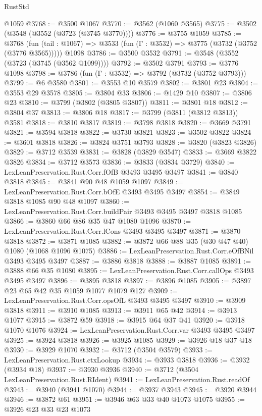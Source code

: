 \begin{lexlean}{RustStd}
\begin{coremodule}
    @1059
@3768 := @3500 @1067
@3770 := @3562 (@1060 @3565)
@3775 := @3502 (@3548 (@3552 (@3723 (@3745 @3770))))
@3776 := @3755 @1059
@3785 := @3768
    (fun (tail : @1067) => @3533 (fun (Γ : @3532) => @3775 (@3732 (@3752 (@3776 @3565)))))
    @1098
@3786 := @3500 @3532
@3791 := @3548 (@3552 (@3723 (@3745 (@3562 @1099))))
@3792 := @3502 @3791
@3793 := @3776 @1098
@3798 := @3786 (fun (Γ : @3532) => @3792 (@3732 (@3752 @3793)))
@3799 := @6 @3580
@3801 := @3553 @10 @3579
@3802 := @3801 @23
@3804 := @3553 @29 @3578
@3805 := @3804 @33
@3806 := @1429 @10
@3807 := @3806 @23
@3810 := @3799 (@3802 (@3805 @3807))
@3811 := @3801 @18
@3812 := @3804 @37
@3813 := @3806 @18
@3817 := @3799 (@3811 (@3812 @3813)) @3581
@3818 := @3810 @3817
@3819 := @3798 @3818
@3820 := @3669 @3791
@3821 := @3594 @3818
@3822 := @3730 @3821
@3823 := @3502 @3822
@3824 := @3601 @3818
@3826 := @3824 @3751 @3793
@3828 := @3820 (@3823 @3826)
@3829 := @3712 @3539
@3831 := @3828 (@3829 @3547)
@3833 := @3669 @3822 @3826
@3834 := @3712 @3573
@3836 := @3833 (@3834 @3729)
@3840 := LexLeanPreservation.Rust.Corr.fOfB @3493 @3495 @3497
@3841 := @3840 @3818
@3845 := @3841 @90 @48 @1059 @1097
@3849 := LexLeanPreservation.Rust.Corr.bOfE @3493 @3495 @3497
@3854 := @3849 @3818 @1085 @90 @48 @1097
@3860 := LexLeanPreservation.Rust.Corr.buildPair @3493 @3495 @3497 @3818 @1085
@3866 := @3860 @66 @86 @35 @47 @1080 @1096
@3870 := LexLeanPreservation.Rust.Corr.lCons @3493 @3495 @3497
@3871 := @3870 @3818
@3872 := @3871 @1085
@3882 := @3872 @66 @88 @35 (@30 @47 @40) @1080 (@1068 @1096 @1075)
@3886 := LexLeanPreservation.Rust.Corr.eOfBNil @3493 @3495 @3497
@3887 := @3886 @3818
@3888 := @3887 @1085
@3891 := @3888 @66 @35 @1080
@3895 := LexLeanPreservation.Rust.Corr.callOps @3493 @3495 @3497
@3896 := @3895 @3818
@3897 := @3896 @1085
@3905 := @3897 @23 @65 @42 @35 @1059 @1077 @1079 @127
@3909 := LexLeanPreservation.Rust.Corr.opsOfL @3493 @3495 @3497
@3910 := @3909 @3818
@3911 := @3910 @1085
@3913 := @3911 @65 @42
@3914 := @3913 @1077
@3915 := @3872 @59
@3918 := @3915 @64 @37 @41
@3920 := @3918 @1070 @1076
@3924 := LexLeanPreservation.Rust.Corr.var @3493 @3495 @3497
@3925 := @3924 @3818
@3926 := @3925 @1085
@3929 := @3926 @18 @37 @18
@3930 := @3929 @1070
@3932 := @3712 (@3504 @3579)
@3933 := LexLeanPreservation.Rust.ctxLookup
@3934 := @3933 @3818
@3936 := @3932 (@3934 @18)
@3937 := @3930 @3936
@3940 := @3712 (@3504 LexLeanPreservation.Rust.RIdent)
@3941 := LexLeanPreservation.Rust.readOf
@3943 := @3940 (@3941 @1070)
@3944 := @3937 @3943
@3945 := @3920 @3944
@3946 := @3872 @61
@3951 := @3946 @63 @33 @40 @1073 @1075
@3955 := @3926 @23 @33 @23 @1073

\end{coremodule}
\end{lexlean}
